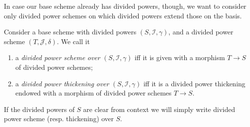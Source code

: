 \noindent
In case our base scheme already has divided powers, though,
we want to consider only divided power schemes on which
divided powers extend those on the basis.
\begin{defn}
	Consider a base scheme with divided powers
	$\left(S, \mathcal{I}, \gamma\right)$, and a divided power
	scheme $\left(T, \mathcal{J}, \delta\right)$.
	We call it 
\begin{enumerate}
	\item a \emph{divided power scheme over $\left(S, \mathcal{I}, \gamma\right)$}
		iff it is given with a morphism 
		$T \to S$
		of divided power schemes;

	\item a \emph{divided power thickening over $\left(S, \mathcal{I}, \gamma\right)$}
		iff it is a divided power thickening endowed
		with a morphism of divided power schemes $T \to S$.
\end{enumerate}
	If the divided powers of $S$ are clear from context we will
	simply write divided power scheme (resp$.$ thickening) over $S$.
\end{defn}


